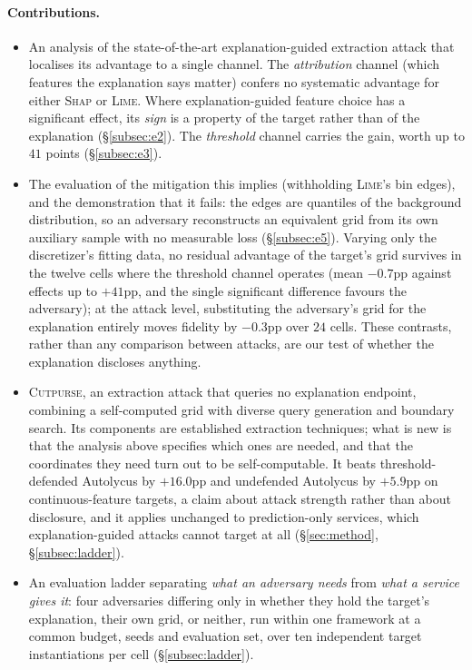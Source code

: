 \documentclass[sigconf,anonymous,review]{acmart}
\newcommand{\sys}{\textsc{Cutpurse}}
\begin{document}
\paragraph{Contributions.}
\begin{itemize}
  \item An analysis of the state-of-the-art explanation-guided extraction attack that localises its
  advantage to a single channel. The \emph{attribution} channel (which features the explanation says matter) confers no systematic advantage for either \textsc{Shap} or \textsc{Lime}. Where explanation-guided feature choice has a significant effect, its \emph{sign} is a property of the
  target rather than of the explanation (\S\ref{subsec:e2}). The \emph{threshold} channel carries the
  gain, worth up to $41$ points (\S\ref{subsec:e3}).
  \item The evaluation of the mitigation this implies (withholding \textsc{Lime}'s bin edges), and the demonstration that it fails: the edges are quantiles of the background distribution, so an
  adversary reconstructs an equivalent grid from its own auxiliary sample with no measurable loss
  (\S\ref{subsec:e5}). Varying only the discretizer's fitting data, no residual advantage of the
  target's grid survives in the twelve cells where the threshold channel operates (mean $-0.7$pp
  against effects up to $+41$pp, and the single significant difference favours the adversary); at the
  attack level, substituting the adversary's grid for
  the explanation entirely moves fidelity by $-0.3$pp over $24$ cells. These contrasts, rather than
  any comparison between attacks, are our test of whether the explanation discloses anything.
  \item \sys, an extraction attack that queries no explanation endpoint, combining a self-computed
  grid with diverse query generation and boundary search. Its components are established extraction
  techniques; what is new is that the analysis above specifies which ones are needed, and that the
  coordinates they need turn out to be self-computable. It beats threshold-defended Autolycus by
  $+16.0$pp and undefended Autolycus by $+5.9$pp on continuous-feature targets, a claim about attack
  strength rather than about disclosure, and it applies unchanged to prediction-only services, which
  explanation-guided attacks cannot target at all (\S\ref{sec:method}, \S\ref{subsec:ladder}).
  \item An evaluation ladder separating \emph{what an adversary needs} from \emph{what a service gives
  it}: four adversaries differing only in whether they hold the target's explanation, their own grid,
  or neither, run within one framework at a common budget, seeds and evaluation set, over ten
  independent target instantiations per cell (\S\ref{subsec:ladder}).
\end{itemize}
\end{document}
